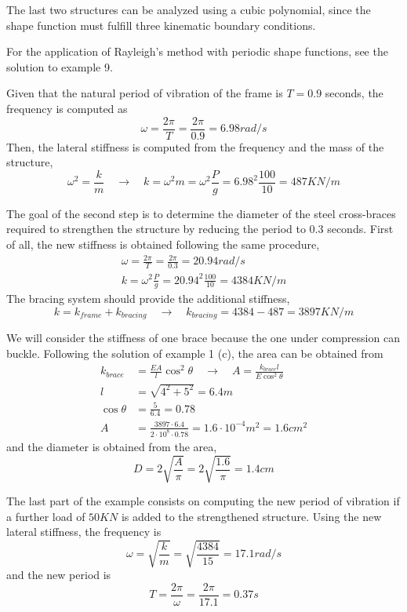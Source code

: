 The last two structures can be analyzed using a cubic polynomial, since the shape function must fulfill three kinematic boundary conditions.

For the application of Rayleigh's method with periodic shape functions, see the solution to example 9.



Given that the natural period of vibration of the frame is $T=0.9$ seconds, the frequency is computed as
$$
\omega = \frac{2\pi}{T} = \frac{2\pi}{0.9} = 6.98rad/s
$$
Then, the lateral stiffness is computed from the frequency and the mass of the structure,
$$
\omega^2 = \frac{k}{m} \quad \rightarrow \quad
k = \omega^2m = \omega^2\frac{P}{g} = 6.98^2\frac{100}{10} = 487KN/m
$$

The goal of the second step is to determine the diameter of the steel cross-braces required to strengthen the structure by reducing the period to 0.3 seconds. First of all, the new stiffness is obtained following the same procedure,
\begin{align*}
\omega = \frac{2\pi}{T} = \frac{2\pi}{0.3} = 20.94rad/s \\
k = \omega^2\frac{P}{g} = 20.94^2\frac{100}{10} = 4384KN/m
\end{align*}
The bracing system should provide the additional stiffness,
$$
k = k_{frame} + k_{bracing} \quad \rightarrow \quad k_{bracing} = 4384 - 487 = 3897KN/m
$$

We will consider the stiffness of one brace because the one under compression can buckle. 
Following the solution of example 1 (c), the area can be obtained from
\begin{align*}
k_{brace} &= \frac{EA}{l}\cos^2\theta \quad \rightarrow \quad A = \frac{k_{brace}l}{E\cos^2\theta} \\
l &= \sqrt{4^2 + 5^2} = 6.4m \\
\cos\theta &= \frac{5}{6.4} = 0.78 \\
A &= \frac{3897\cdot 6.4}{2\cdot 10^8\cdot 0.78} = 1.6\cdot 10^{-4} m^2 = 1.6cm^2
\end{align*}
and the diameter is obtained from the area,
$$
D = 2\sqrt{\frac{A}{\pi}} = 2\sqrt{\frac{1.6}{\pi}} = 1.4cm
$$

The last part of the example consists on computing the new period of vibration if a further load of $50KN$ is added to the strengthened structure. Using the new lateral stiffness, the frequency is
$$
\omega = \sqrt{\frac{k}{m}} = \sqrt{\frac{4384}{15}} = 17.1 rad/s
$$
and the new period is
$$
T = \frac{2\pi}{\omega} = \frac{2\pi}{17.1} = 0.37s
$$



